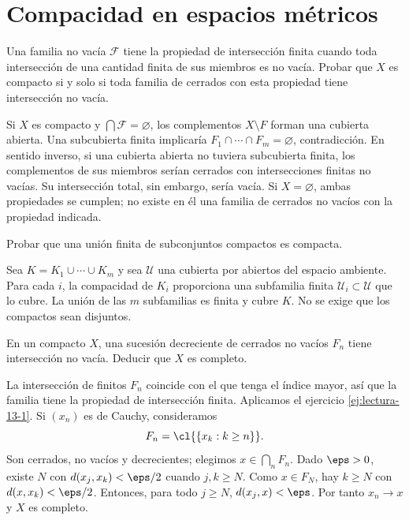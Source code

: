 \chapter{Compacidad en espacios métricos}

\begin{ejercicio}\label{ej:lectura-13-1}
Una familia no vacía $\mathcal F$ tiene la propiedad de intersección finita cuando toda intersección de una cantidad finita de sus miembros es no vacía. Probar que $X$ es compacto si y solo si toda familia de cerrados con esta propiedad tiene intersección no vacía.
\end{ejercicio}
\begin{solucion}
Si $X$ es compacto y $\bigcap\mathcal F=\varnothing$, los complementos $X\setminus F$ forman una cubierta abierta. Una subcubierta finita implicaría $F_1\cap\cdots\cap F_m=\varnothing$, contradicción. En sentido inverso, si una cubierta abierta no tuviera subcubierta finita, los complementos de sus miembros serían cerrados con intersecciones finitas no vacías. Su intersección total, sin embargo, sería vacía. Si $X=\varnothing$, ambas propiedades se cumplen; no existe en él una familia de cerrados no vacíos con la propiedad indicada.
\end{solucion}

\begin{ejercicio}\label{ej:lectura-13-2}
Probar que una unión finita de subconjuntos compactos es compacta.
\end{ejercicio}
\begin{solucion}
Sea $K=K_1\cup\cdots\cup K_m$ y sea $\mathcal U$ una cubierta por abiertos del espacio ambiente. Para cada $i$, la compacidad de $K_i$ proporciona una subfamilia finita $\mathcal U_i\subset\mathcal U$ que lo cubre. La unión de las $m$ subfamilias es finita y cubre $K$. No se exige que los compactos sean disjuntos.
\end{solucion}

\begin{ejercicio}\label{ej:lectura-13-3}
En un compacto $X$, una sucesión decreciente de cerrados no vacíos $F_n$ tiene intersección no vacía. Deducir que $X$ es completo.
\end{ejercicio}
\begin{solucion}
La intersección de finitos $F_n$ coincide con el que tenga el índice mayor, así que la familia tiene la propiedad de intersección finita. Aplicamos el ejercicio \ref{ej:lectura-13-1}. Si $(x_n)$ es de Cauchy, consideramos
\[
F_n=\cl{\{x_k:k\ge n\}}.
\]
Son cerrados, no vacíos y decrecientes; elegimos $x\in\bigcap_nF_n$. Dado $\eps>0$, existe $N$ con $d(x_j,x_k)<\eps/2$ cuando $j,k\ge N$. Como $x\in F_N$, hay $k\ge N$ con $d(x,x_k)<\eps/2$. Entonces, para todo $j\ge N$, $d(x_j,x)<\eps$. Por tanto $x_n\to x$ y $X$ es completo.
\end{solucion}

